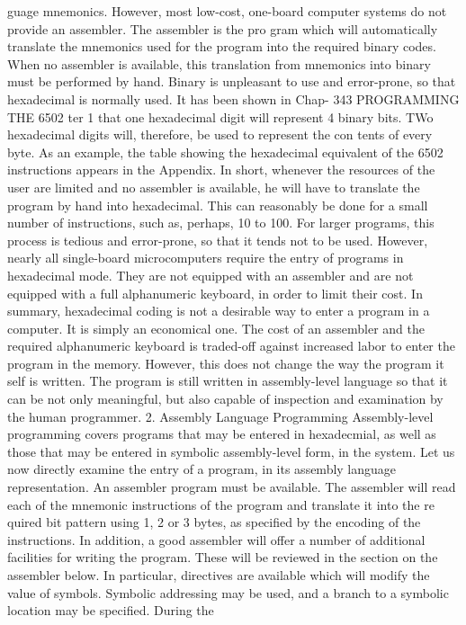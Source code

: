 \documentclass{book}
\begin{document}
{{{{{{{{{{{{{{{{{{{{{{{{{{{{{{{{{{{{{{{{{{{{{{{{{{{{{{{{{{{{{{{{{{{{{{{{{{{{{{{{{{{{{{{{{{{{{{{{{{{{{{{{{{{{{{{{{{{{{{{{{{{{{{{{{{{{{{{{{{{{guage mnemonics. However, most low-cost, one-board computer
systems do not provide an assembler. The assembler is the pro
gram which will automatically translate the mnemonics used for
the program into the required binary codes. When no assembler is
available, this translation from mnemonics into binary must be
performed by hand. Binary is unpleasant to use and error-prone,
so that hexadecimal is normally used. It has been shown in Chap-
343
PROGRAMMING THE 6502
ter 1 that one hexadecimal digit will represent 4 binary bits. TWo
hexadecimal digits will, therefore, be used to represent the con
tents of every byte. As an example, the table showing the
hexadecimal equivalent of the 6502 instructions appears in the
Appendix.
In short, whenever the resources of the user are limited and no
assembler is available, he will have to translate the program by
hand into hexadecimal. This can reasonably be done for a small
number of instructions, such as, perhaps, 10 to 100. For larger
programs, this process is tedious and error-prone, so that it tends
not to be used. However, nearly all single-board microcomputers
require the entry of programs in hexadecimal mode. They are not
equipped with an assembler and are not equipped with a full
alphanumeric keyboard, in order to limit their cost.
In summary, hexadecimal coding is not a desirable way to enter
a program in a computer. It is simply an economical one. The cost
of an assembler and the required alphanumeric keyboard is
traded-off against increased labor to enter the program in the
memory. However, this does not change the way the program it
self is written. The program is still written in assembly-level language
so that it can be not only meaningful, but also capable of inspection
and examination by the human programmer.
2. Assembly Language Programming
Assembly-level programming covers programs that may be entered
in hexadecmial, as well as those that may be entered in symbolic
assembly-level form, in the system. Let us now directly examine the
entry of a program, in its assembly language representation. An
assembler program must be available. The assembler will read each of
the mnemonic instructions of the program and translate it into the re
quired bit pattern using 1, 2 or 3 bytes, as specified by the encoding of
the instructions. In addition, a good assembler will offer a number of
additional facilities for writing the program. These will be reviewed in
the section on the assembler below. In particular, directives are available
which will modify the value of symbols. Symbolic addressing may be used,
and a branch to a symbolic location may be specified. During the
}}}}}}}}}}}}}}}}}}}}}}}}}}}}}}}}}}}}}}}}}}}}}}}}}}}}}}}}}}}}}}}}}}}}}}}}}}}}}}}}}}}}}}}}}}}}}}}}}}}}}}}}}}}}}}}}}}}}}}}}}}}}}}}}}}}}}}}}}}}}
\end{document}
